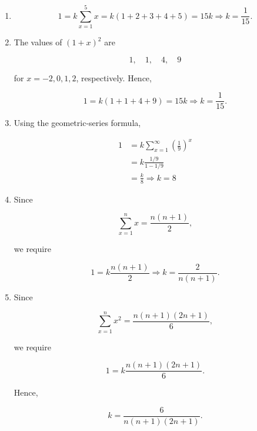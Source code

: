 \documentclass[11pt]{article}
\newenvironment{solution}{
    \par
    \begin{tcolorbox}[
        colback=white,
        colframe=uwgold,
        boxrule=0.7pt,
        arc=2mm,
        left=3mm,
        right=3mm,
        top=2mm,
        bottom=2mm,
        breakable,
        before skip=0.5em,
        after skip=1em,
        title=\textbf{Solution},
        coltitle=uwpurple,
        fonttitle=\bfseries
    ]
}{
    \end{tcolorbox}
}
\begin{document}
\begin{solution}

\begin{enumerate}[label=(\alph*)]

\item

\[
1
=
k\sum_{x=1}^{5}x
=
k(1+2+3+4+5)
=
15k\Rightarrow  {k=\frac1{15}}.
\]

 

\item The values of \((1+x)^2\) are

\[
1,\quad1,\quad4,\quad9
\]

for \(x=-2,0,1,2\), respectively. Hence,

\[
1
=
k(1+1+4+9)
=
15k\Rightarrow  {k=\frac1{15}}.
\]

 

\item Using the geometric-series formula,

\begin{align*}
1
&=
k\sum_{x=1}^{\infty}\left(\frac19\right)^x\\
&=
k\frac{1/9}{1-1/9}\\
&=
\frac{k}{8} \Rightarrow k=8
\end{align*}


\item Since

\[
\sum_{x=1}^{n}x
=
\frac{n(n+1)}{2},
\]

we require

\[
1
=
k\frac{n(n+1)}{2} \Rightarrow k=\frac{2}{n(n+1)}.
\]


\item Since

\[
\sum_{x=1}^{n}x^2
=
\frac{n(n+1)(2n+1)}{6},
\]

we require

\[
1
=
k\frac{n(n+1)(2n+1)}{6}.
\]

Hence,

\[
 {
k=\frac{6}{n(n+1)(2n+1)}.
}
\]

\end{enumerate}

\end{solution}
 


\end{document}
